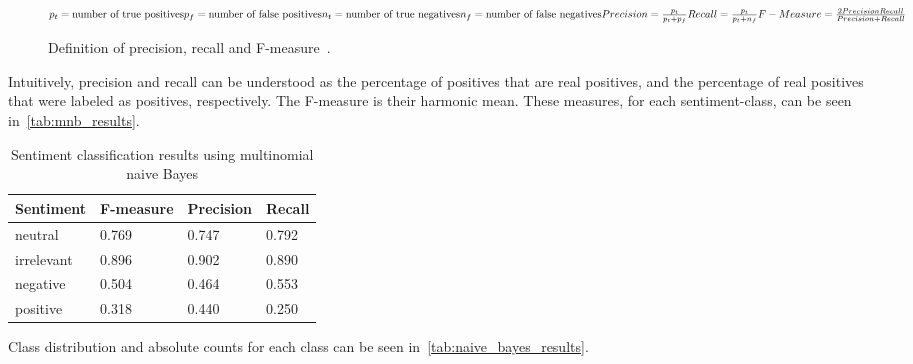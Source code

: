 \begin{figure}
    \caption{Definition of precision, recall and F-measure~\cite{Hong2010}.}
    \label{math:precision_recall_fmeasure}
    \begin{math}
        \\
        p_t = \textrm{number of true positives}\\
        p_f = \textrm{number of false positives}\\
        n_t = \textrm{number of true negatives}\\
        n_f = \textrm{number of false negatives}\\
        \\
        Precision = \frac{p_t}{p_t + p_f}\\
        Recall = \frac{p_t}{p_t + n_f}\\
        \\
        F-Measure = \frac{2 \* Precision \* Recall}{Precision + Recall}\\
    \end{math}
\end{figure}

Intuitively, precision and recall can be understood as the percentage of positives that are real positives,
and the percentage of real positives that were labeled as positives, respectively.
The F-measure is their harmonic mean.
These measures, for each sentiment-class, can be seen in~\autoref{tab:mnb_results}.

\begin{table}
    \caption{Sentiment classification results using multinomial naive Bayes}
    \label{tab:mnb_results}
    \centering
    \begin{tabular}{llll} %
        \toprule
        Sentiment
        & F-measure
        & Precision
        & Recall
        \\\midrule
        neutral & 0.769 & 0.747 & 0.792
        \\\midrule
        irrelevant & 0.896 & 0.902 & 0.890
        \\\midrule
        negative & 0.504 & 0.464 & 0.553
        \\\midrule
        positive & 0.318 & 0.440 & 0.250
        \\\bottomrule
    \end{tabular}
\end{table}

Class distribution and absolute counts for each class can be seen in~\autoref{tab:naive_bayes_results}.

